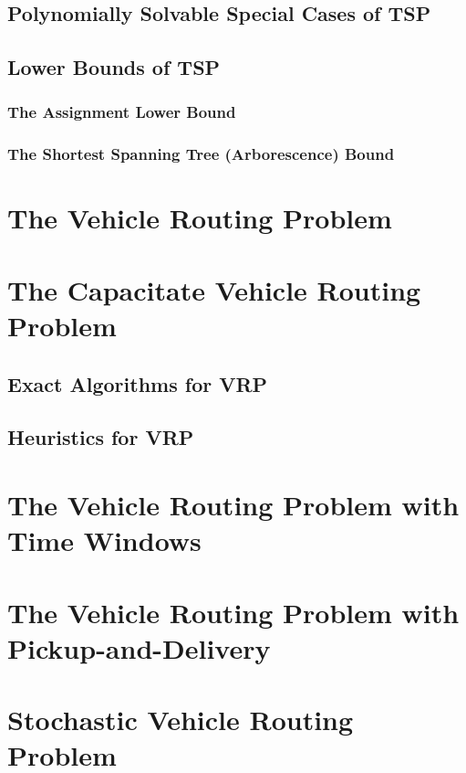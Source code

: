 			\section{Polynomially Solvable Special Cases of TSP}

			\section{Lower Bounds of TSP}
				\subsection{The Assignment Lower Bound}


				\subsection{The Shortest Spanning Tree (Arborescence) Bound}

		\chapter{The Vehicle Routing Problem}

		\chapter{The Capacitate Vehicle Routing Problem}
			\section{Exact Algorithms for VRP}

			\section{Heuristics for VRP}

		\chapter{The Vehicle Routing Problem with Time Windows}

		\chapter{The Vehicle Routing Problem with Pickup-and-Delivery}

		\chapter{Stochastic Vehicle Routing Problem}

